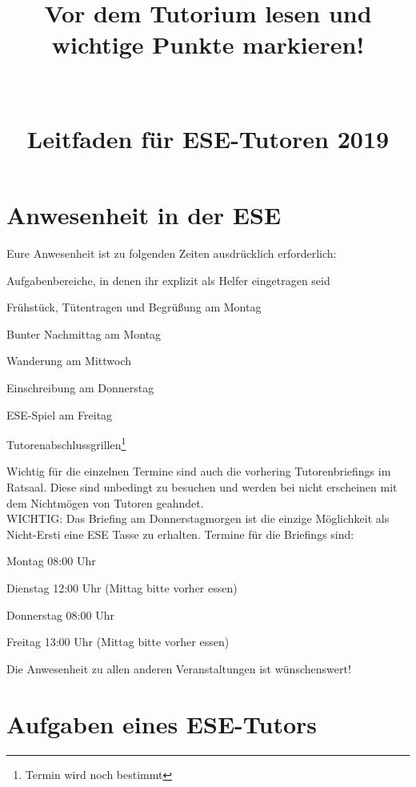 \documentclass[a4paper,12pt]{report}
\begin{document}
\title{\huge{\textbf{Vor dem Tutorium lesen und wichtige Punkte markieren!}}\\\ \\\ \\{Leitfaden für ESE-Tutoren 2019}}
\date{}
\author{}
\maketitle

\section*{Anwesenheit in der ESE}
Eure Anwesenheit ist zu folgenden Zeiten ausdrücklich erforderlich:
\begin{itemize*}
	\item Aufgabenbereiche, in denen ihr explizit als Helfer eingetragen seid
	\item Frühstück, Tütentragen und Begrüßung am Montag
	\item Bunter Nachmittag am Montag
	\item Wanderung am Mittwoch
	\item Einschreibung am Donnerstag
	\item ESE-Spiel am Freitag
	\item Tutorenabschlussgrillen\footnote[1]{Termin wird noch bestimmt} %
\end{itemize*}
Wichtig für die einzelnen Termine sind auch die vorhering Tutorenbriefings im Ratsaal. Diese sind unbedingt zu besuchen und werden bei nicht erscheinen mit dem Nichtmögen von Tutoren geahndet.\\
WICHTIG: Das Briefing am Donnerstagmorgen ist die einzige Möglichkeit als Nicht-Ersti eine ESE Tasse zu erhalten.
Termine für die Briefings sind:
\begin{itemize*}
	\item Montag   		08:00 Uhr
	\item Dienstag 		12:00 Uhr (Mittag bitte vorher essen)
	\item Donnerstag	08:00 Uhr
	\item Freitag		13:00 Uhr (Mittag bitte vorher essen)
\end{itemize*}

Die Anwesenheit zu allen anderen Veranstaltungen ist wünschenswert!

\section*{Aufgaben eines ESE-Tutors}
\end{document}
